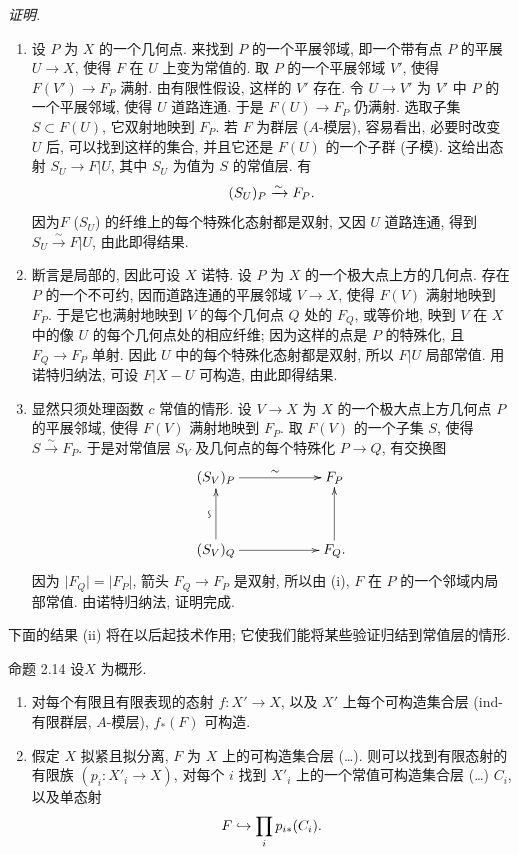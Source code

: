 \emph{证明.}
\begin{enumerate}
\renewcommand{\theenumi}{\roman{enumi}}
\renewcommand{\labelenumi}{(\theenumi)}
\item 设 $P$ 为 $X$ 的一个几何点.
来找到 $P$ 的一个平展邻域, 即一个带有点 $P$ 的平展 $U\rightarrow X$,
使得 $F$ 在 $U$ 上变为常值的.
取 $P$ 的一个平展邻域 $V'$, 使得 $F(V')\rightarrow F_P$ 满射.
由有限性假设, 这样的 $V'$ 存在.
令 $U\rightarrow V'$ 为 $V'$ 中 $P$ 的一个平展邻域, 使得 $U$ 道路连通.
于是 $F(U)\rightarrow F_P$ 仍满射.
选取子集 $S\subset F(U)$, 它双射地映到 $F_P$.
若 $F$ 为群层 (\resp $A$-模层), 容易看出, 必要时改变 $U$ 后,
可以找到这样的集合, 并且它还是 $F(U)$ 的一个子群 (\resp 子模).
这给出态射 $S_U\rightarrow F| U$, 其中 $S_U$ 为值为 $S$ 的常值层.
有
$$
(S_U)_P\xrightarrow{\sim}F_P{}.
$$
因为\pageoriginale $F$ (\resp $S_U$) 的纤维上的每个特殊化态射都是双射,
又因 $U$ 道路连通, 得到 $S_U\xrightarrow{\sim}F| U$, 由此即得结果.

\item 断言是局部的, 因此可设 $X$ 诺特.
设 $P$ 为 $X$ 的一个极大点上方的几何点.
存在 $P$ 的一个不可约, 因而道路连通的平展邻域 $V\rightarrow X$,
使得 $F(V)$ 满射地映到 $F_P$.
于是它也满射地映到 $V$ 的每个几何点 $Q$ 处的 $F_Q$,
或等价地, 映到 $V$ 在 $X$ 中的像 $U$ 的每个几何点处的相应纤维;
因为这样的点是 $P$ 的特殊化, 且 $F_Q\rightarrow F_P$ 单射.
因此 $U$ 中的每个特殊化态射都是双射, 所以 $F| U$ 局部常值.
用诺特归纳法, 可设 $F| X-U$ 可构造, 由此即得结果.

\item 显然只须处理函数 $c$ 常值的情形.
设 $V\rightarrow X$ 为 $X$ 的一个极大点上方几何点 $P$ 的平展邻域,
使得 $F(V)$ 满射地映到 $F_P$.
取 $F(V)$ 的一个子集 $S$, 使得 $S\xrightarrow{\sim}F_P$.
于是对常值层 $S_V$ 及几何点的每个特殊化 $P\rightarrow Q$, 有交换图
$$
\xymatrix@C=2cm@R=1.25cm{
(S_V)_P   \ar[r]^{\sim}& F_P\\
(S_V)_Q   \ar[r] \ar[u]^{\text{\rotatebox{90}{$\backsim$}}}  & F_Q. \ar[u]
}
$$
因为 $\lvert F_Q\rvert=\lvert F_P\rvert$,
箭头 $F_Q\rightarrow F_P$ 是双射,
所以由 (i), $F$ 在 $P$ 的一个邻域内局部常值.
由诺特归纳法, 证明完成.
\end{enumerate}

下面的结果 (ii) 将在以后起技术作用;
它使我们能将某些验证归结到常值层的情形.

\begin{enonce*}{命题 2.14}
设\pageoriginale $X$ 为概形.
\begin{enumerate}
\renewcommand{\theenumi}{\roman{enumi}}
\renewcommand{\labelenumi}{(\theenumi)}
\item 对每个有限且有限表现的态射 $f:X'\rightarrow X$,
以及 $X'$ 上每个可构造集合层 (\resp ind-有限群层, \resp $A$-模层),
$f_{\ast}(F)$ 可构造.

\item 假定 $X$ 拟紧且拟分离, $F$ 为 $X$ 上的可构造集合层 (\resp\ldots).
则可以找到有限态射的有限族 $(p_i:X'_i\rightarrow X)$,
对每个 $i$ 找到 $X'_i$ 上的一个常值可构造集合层 (\resp\ldots) $C_i$,
以及单态射
$$
F\hookrightarrow \prod_i p_{i\ast}(C_i){}.
$$
\end{enumerate}
\end{enonce*}

